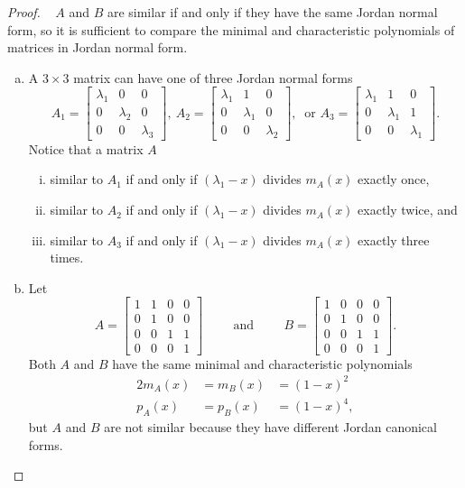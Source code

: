 \documentclass{article}
\begin{document}
\begin{proof} ~
  $A$ and $B$ are similar if and only if they have the same Jordan
  normal form, so it is sufficient to compare the minimal and characteristic
  polynomials of matrices in Jordan normal form.
  \begin{enumerate}[(a)]
    \item A $3 \times 3$ matrix can have one of three Jordan normal forms \[
    A_1 = \begin{bmatrix}
      \lambda_1 & 0 & 0 \\
      0 & \lambda_2 & 0 \\
      0 & 0 & \lambda_3
    \end{bmatrix},\
    A_2 = \begin{bmatrix}
      \lambda_1 & 1 & 0 \\
      0 & \lambda_1 & 0 \\
      0 & 0 & \lambda_2
    \end{bmatrix},\ \text{ or }
    A_3 = \begin{bmatrix}
      \lambda_1 & 1 & 0 \\
      0 & \lambda_1 & 1 \\
      0 & 0 & \lambda_1
    \end{bmatrix}.
    \]
    Notice that a matrix $A$ \begin{enumerate}[(i)]
      \item similar to $A_1$ if and only if $(\lambda_1 - x)$ divides $m_{A}(x)$ exactly once,
      \item similar to $A_2$ if and only if $(\lambda_1 - x)$ divides $m_{A}(x)$ exactly twice, and
      \item similar to $A_3$ if and only if $(\lambda_1 - x)$ divides $m_{A}(x)$ exactly three times.
    \end{enumerate}
    \item Let \[
      A = \begin{bmatrix}
        1 & 1 & 0 & 0 \\
        0 & 1 & 0 & 0 \\
        0 & 0 & 1 & 1 \\
        0 & 0 & 0 & 1
      \end{bmatrix}
      \hspace{1cm}\text{and}\hspace{1cm}
      B = \begin{bmatrix}
        1 & 0 & 0 & 0 \\
        0 & 1 & 0 & 0 \\
        0 & 0 & 1 & 1 \\
        0 & 0 & 0 & 1
      \end{bmatrix}.
    \]
    Both $A$ and $B$ have the same minimal and characteristic polynomials
    \begin{alignat*}{2}
      m_A(x) &= m_B(x) &= (1-x)^2 \\
      p_A(x) &= p_B(x) &= (1-x)^4,
    \end{alignat*}
    but $A$ and $B$ are not similar because they have different Jordan
    canonical forms.
  \end{enumerate}
\end{proof}
\end{document}
